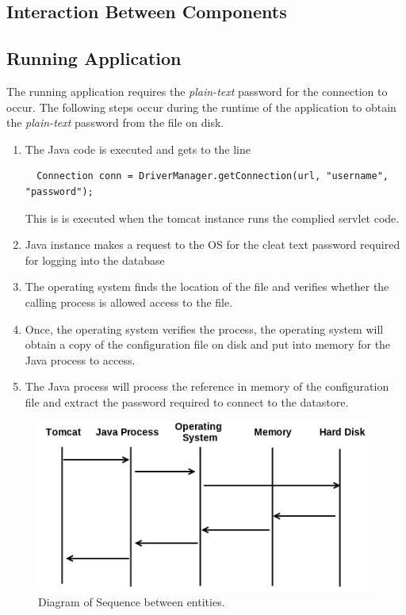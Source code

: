 \documentclass[11pt, a4paper, twoside, notitlepage]{article}
\begin{document}
\subsection*{Interaction Between Components}
\subsection*{Running Application}
The running application requires the \emph{plain-text} password for the connection to occur. The following steps occur during the runtime of the application to obtain the \emph{plain-text} password from the file on disk. 

\begin{enumerate}
\item The Java code is executed and gets to the line
\begin{lstlisting}
  Connection conn = DriverManager.getConnection(url, "username", "password");
\end{lstlisting}
This is is executed when the tomcat instance runs the complied servlet code.
\item Java instance makes a request to the OS for the cleat text password required for logging into the database
\item The operating system finds the location of the file and verifies whether the calling process is allowed access to the file.
\item Once, the operating system verifies the process, the operating system will obtain a copy of the configuration file on disk and put into memory for the Java process to access.
\item The Java process will process the reference in memory of the configuration file and extract the password required to connect to the datastore.
\end{enumerate}

\begin{figure}[h!]
    \centering
    \includegraphics[height=0.2\paperheight]{sequence_diagram}
    \caption{Diagram of Sequence between entities.}
\end{figure}
\end{document}
